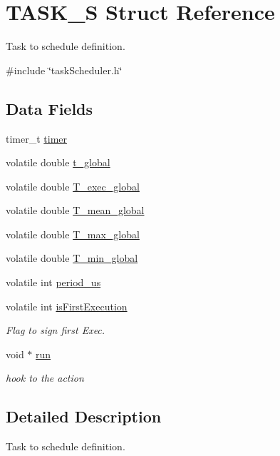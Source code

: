 \hypertarget{structTASK__S}{\section{T\-A\-S\-K\-\_\-\-S Struct Reference}
\label{structTASK__S}
}


Task to schedule definition.  




{\ttfamily \#include \char`\"{}task\-Scheduler.\-h\char`\"{}}

\subsection*{Data Fields}
\begin{DoxyCompactItemize}
\item 
timer\-\_\-t \hyperlink{structTASK__S_a17834f3d4f84241ccb4191f3cf7d7af3}{timer}
\item 
volatile double \hyperlink{structTASK__S_a29a175bdd4b9f880a2b69bb5186e3c7e}{t\-\_\-global}
\item 
volatile double \hyperlink{structTASK__S_ae06b712fd9963cff8192e9ef3140bc6d}{T\-\_\-exec\-\_\-global}
\item 
volatile double \hyperlink{structTASK__S_a9ebae87e1b64869f328a47473f2ea7d7}{T\-\_\-mean\-\_\-global}
\item 
volatile double \hyperlink{structTASK__S_a430c874cbf361b6dbc75ad1540880948}{T\-\_\-max\-\_\-global}
\item 
volatile double \hyperlink{structTASK__S_a07174e333a0013f4d51b30509b388f58}{T\-\_\-min\-\_\-global}
\item 
volatile int \hyperlink{structTASK__S_aabd8f80831e6cfd8e51bbd371eed907b}{period\-\_\-us}
\item 
volatile int \hyperlink{structTASK__S_a4b50404ee955691f1c62845cdc9de676}{is\-First\-Execution}
\begin{DoxyCompactList}\small\item\em Flag to sign first Exec. \end{DoxyCompactList}\item 
void $\ast$ \hyperlink{structTASK__S_abe9c219d2f60c43991788786735599f2}{run}
\begin{DoxyCompactList}\small\item\em hook to the action \end{DoxyCompactList}\end{DoxyCompactItemize}


\subsection{Detailed Description}
Task to schedule definition. 


